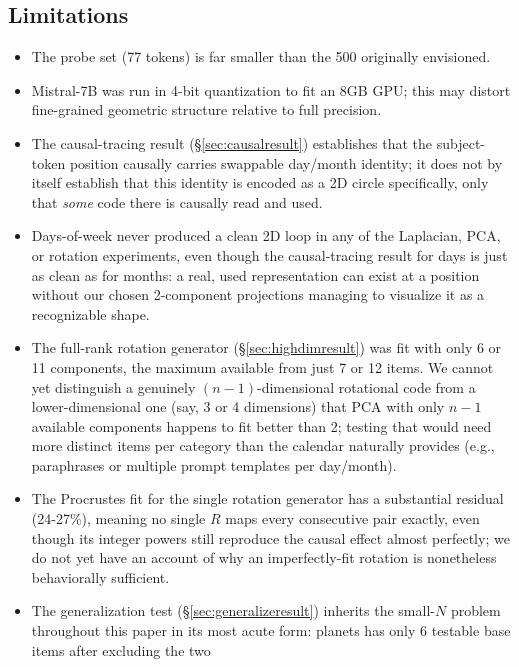 \documentclass[11pt]{article}
\begin{document}
\subsection{Limitations}
\begin{itemize}
  \item The probe set (77 tokens) is far smaller than the 500 originally
        envisioned.
  \item Mistral-7B was run in 4-bit quantization to fit an 8GB GPU; this may
        distort fine-grained geometric structure relative to full precision.
  \item The causal-tracing result (\S\ref{sec:causalresult}) establishes that
        the subject-token position causally carries swappable day/month
        identity; it does not by itself establish that this identity is
        encoded as a 2D circle specifically, only that \emph{some} code there
        is causally read and used.
  \item Days-of-week never produced a clean 2D loop in any of the Laplacian,
        PCA, or rotation experiments, even though the causal-tracing result
        for days is just as clean as for months: a real, used representation
        can exist at a position without our chosen 2-component projections
        managing to visualize it as a recognizable shape.
  \item The full-rank rotation generator (\S\ref{sec:highdimresult}) was fit
        with only 6 or 11 components, the maximum available from just 7 or
        12 items. We cannot yet distinguish a genuinely $(n{-}1)$-dimensional
        rotational code from a lower-dimensional one (say, 3 or 4
        dimensions) that PCA with only $n{-}1$ available components happens
        to fit better than 2; testing that would need more distinct items
        per category than the calendar naturally provides (e.g., paraphrases
        or multiple prompt templates per day/month).
  \item The Procrustes fit for the single rotation generator has a
        substantial residual (24-27\%), meaning no single $R$ maps every
        consecutive pair exactly, even though its integer powers still
        reproduce the causal effect almost perfectly; we do not yet have an
        account of why an imperfectly-fit rotation is nonetheless
        behaviorally sufficient.
  \item The generalization test (\S\ref{sec:generalizeresult}) inherits the
        small-$N$ problem throughout this paper in its most acute form:
        planets has only 6 testable base items after excluding the two

\end{itemize}
\end{document}

